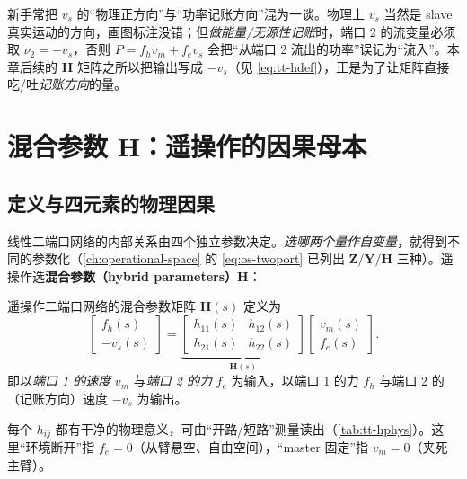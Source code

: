 \begin{pitfall}
新手常把 $v_s$ 的“物理正方向”与“功率记账方向”混为一谈。物理上 $v_s$ 当然是 slave 真实运动的方向，画图标注没错；但\emph{做能量/无源性记账}时，端口 2 的流变量必须取 $\nu_2=-v_s$，否则 $P=f_hv_m+f_ev_s$ 会把“从端口 2 流出的功率”误记为“流入”。本章后续的 $\mathbf H$ 矩阵之所以把输出写成 $-v_s$（见 \cref{eq:tt-hdef}），正是为了让矩阵直接吃/吐\emph{记账方向}的量。
\end{pitfall}

\section{混合参数 H：遥操作的因果母本}
\label{sec:tt-hparam}

\subsection{定义与四元素的物理因果}
\label{sec:tt-hdef}

线性二端口网络的内部关系由四个独立参数决定。\emph{选哪两个量作自变量}，就得到不同的参数化（\cref{ch:operational-space} 的 \cref{eq:os-twoport} 已列出 $\mathbf Z/\mathbf Y/\mathbf H$ 三种）。遥操作选\textbf{混合参数（hybrid parameters）}$\mathbf H$：

\begin{definition}[混合参数矩阵]\label{def:tt-hmatrix}
遥操作二端口网络的混合参数矩阵 $\mathbf H(s)$ 定义为
\begin{equation}
  \begin{bmatrix} f_h(s) \\[1pt] -v_s(s) \end{bmatrix}
  =\underbrace{\begin{bmatrix} h_{11}(s) & h_{12}(s) \\[1pt] h_{21}(s) & h_{22}(s) \end{bmatrix}}_{\mathbf H(s)}
  \begin{bmatrix} v_m(s) \\[1pt] f_e(s) \end{bmatrix}.
  \label{eq:tt-hdef}
\end{equation}
即以\emph{端口 1 的速度} $v_m$ 与\emph{端口 2 的力} $f_e$ 为输入，以端口 1 的力 $f_h$ 与端口 2 的（记账方向）速度 $-v_s$ 为输出。
\end{definition}

每个 $h_{ij}$ 都有干净的物理意义，可由“开路/短路”测量读出（\cref{tab:tt-hphys}）。这里“环境断开”指 $f_e=0$（从臂悬空、自由空间），“master 固定”指 $v_m=0$（夹死主臂）。

